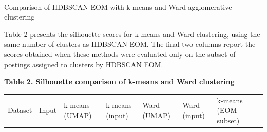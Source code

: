 \documentclass[
  letterpaper,
  DIV=11,
  numbers=noendperiod,
  sfdefaults=false]{scrartcl}
\makeatletter
\let\oldparagraph\paragraph
\renewcommand{\paragraph}{
    \@ifstar
      \xxxParagraphStar
      \xxxParagraphNoStar
  }
\newcommand{\xxxParagraphStar}[1]{\oldparagraph*{#1}\mbox{}}
\newcommand{\xxxParagraphNoStar}[1]{\oldparagraph{#1}\mbox{}}
\newcounter{none} %
\makeatother
\begin{document}
\paragraph{Comparison of HDBSCAN EOM with k-means and Ward agglomerative
clustering}\label{comparison-of-hdbscan-eom-with-k-means-and-ward-agglomerative-clustering}

Table 2 presents the silhouette scores for k-means and Ward clustering,
using the same number of clusters as HDBSCAN EOM. The final two columns
report the scores obtained when these methods were evaluated only on the
subset of postings assigned to clusters by HDBSCAN EOM.

\textbf{Table 2. Silhouette comparison of k-means and Ward clustering}

{\def\LTcaptype{none} %
\begin{longtable}[]{@{}
  >{\raggedright\arraybackslash}p{}
  >{\raggedright\arraybackslash}p{}
  >{\raggedleft\arraybackslash}p{}
  >{\raggedleft\arraybackslash}p{}
  >{\raggedleft\arraybackslash}p{}
  >{\raggedleft\arraybackslash}p{}
  >{\raggedleft\arraybackslash}p{}
  >{\raggedleft\arraybackslash}p{}@{}}
\toprule\noalign{}
\begin{minipage}[b]{\linewidth}\raggedright
Dataset
\end{minipage} & \begin{minipage}[b]{\linewidth}\raggedright
Input
\end{minipage} & \begin{minipage}[b]{\linewidth}\raggedleft
k-means (UMAP)
\end{minipage} & \begin{minipage}[b]{\linewidth}\raggedleft
k-means (input)
\end{minipage} & \begin{minipage}[b]{\linewidth}\raggedleft
Ward (UMAP)
\end{minipage} & \begin{minipage}[b]{\linewidth}\raggedleft
Ward (input)
\end{minipage} & \begin{minipage}[b]{\linewidth}\raggedleft
k-means (EOM subset)
\end{minipage} & \begin{minipage}[b]{\linewidth}\raggedleft

\end{minipage}
\end{longtable}}
\end{document}
